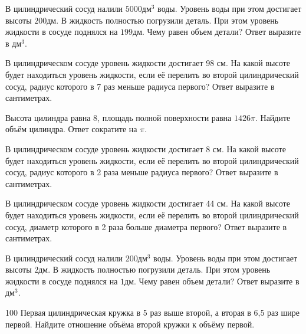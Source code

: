 \documentclass[4apaper]{article}
\begin{document}
\begin{taskBN}{94}
В цилиндрический сосуд налили $5000\mbox{дм}^3$ воды. Уровень воды при этом достигает высоты $200$дм. В жидкость полностью погрузили деталь. При этом уровень жидкости в сосуде поднялся на $199$дм. Чему равен объем детали? Ответ выразите в $\mbox{дм}^3$.
\end{taskBN}

\begin{taskBN}{95}
В цилиндрическом сосуде уровень жидкости достигает 98 см. На какой высоте будет находиться уровень жидкости, если её перелить во второй цилиндрический сосуд, радиус которого в 7 раз меньше радиуса первого? Ответ выразите в сантиметрах.
\end{taskBN}

\begin{taskBN}{96}
Высота цилиндра равна $8$, площадь полной поверхности равна $1426\pi$. Найдите объём цилиндра. Ответ сократите на $\pi$.
\end{taskBN}

\begin{taskBN}{97}
В цилиндрическом сосуде уровень жидкости достигает 8 см. На какой высоте будет находиться уровень жидкости, если её перелить во второй цилиндрический сосуд, радиус которого в 2 раза меньше радиуса первого? Ответ выразите в сантиметрах.
\end{taskBN}

\begin{taskBN}{98}
В цилиндрическом сосуде уровень жидкости достигает 44 см. На какой высоте будет находиться уровень жидкости, если её перелить во второй цилиндрический сосуд, диаметр которого в 2 раза больше диаметра первого? Ответ выразите в сантиметрах.
\end{taskBN}

\begin{taskBN}{99}
В цилиндрический сосуд налили $200\mbox{дм}^3$ воды. Уровень воды при этом достигает высоты $2$дм. В жидкость полностью погрузили деталь. При этом уровень жидкости в сосуде поднялся на $1$дм. Чему равен объем детали? Ответ выразите в $\mbox{дм}^3$.
\end{taskBN}

\begin{taskBN}{100}
 Первая цилиндрическая кружка в 5 раз выше второй, а вторая в 6,5 раз шире первой. Найдите отношение объёма второй кружки к объёму первой.
\end{taskBN}
\end{document}
